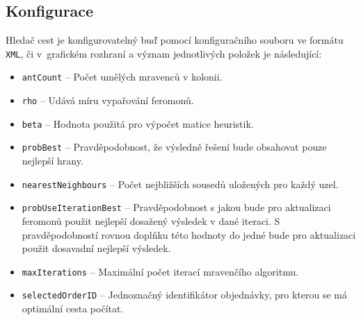 \subsection{Konfigurace}
Hledač cest je konfigurovatelný buď pomocí konfiguračního souboru ve formátu \texttt{XML}, či v~grafickém rozhraní a význam jednotlivých položek je následující:

\begin{itemize}
    \item \texttt{antCount} -- Počet umělých mravenců v kolonii.
    \item \texttt{rho} -- Udává míru vypařování feromonů.
    \item \texttt{beta} -- Hodnota použitá pro výpočet matice heuristik.
    \item \texttt{probBest} -- Pravděpodobnost, že výsledně řešení bude obsahovat pouze nejlepší hrany.
    \item \texttt{nearestNeighbours} -- Počet nejbližších sousedů uložených pro každý uzel.
    \item \texttt{probUseIterationBest} -- Pravděpodobnost s jakou bude pro aktualizaci feromonů použit nejlepší dosažený výsledek v dané iteraci. S pravděpodobností rovnou doplňku této hodnoty do jedné bude pro aktualizaci použit dosavadní nejlepší výsledek.
    \item \texttt{maxIterations} -- Maximální počet iterací mravenčího algoritmu.
    \item \texttt{selectedOrderID} -- Jednoznačný identifikátor objednávky, pro kterou se má optimální cesta počítat.
\end{itemize}


